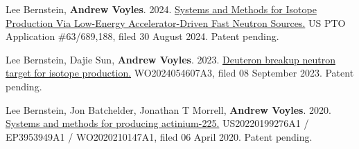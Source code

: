 \begin{bibsection}


\item Lee Bernstein, \textbf{Andrew Voyles}. 2024. \href{}{Systems and Methods for Isotope Production Via Low-Energy Accelerator-Driven Fast Neutron Sources.} US PTO Application \#63/689,188, filed 30 August 2024. Patent pending.



\item Lee Bernstein, Dajie Sun, \textbf{Andrew Voyles}. 2023. \href{https://patents.google.com/patent/WO2024054607A3/en}{Deuteron breakup neutron target for isotope production.} WO2024054607A3, filed 08 September 2023. Patent pending.

\item Lee Bernstein, Jon Batchelder, Jonathan T Morrell, \textbf{Andrew Voyles}. 2020. \href{https://patents.google.com/patent/US20220199276A1/en}{Systems and methods for producing actinium-225.} US20220199276A1 / EP3953949A1 / WO2020210147A1, filed 06 April 2020. Patent pending.












\end{bibsection}
